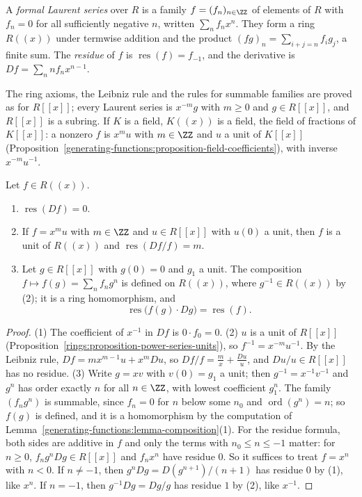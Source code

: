 \begin{definition}\label{generating-functions:definition-laurent}
A \emph{formal Laurent series} over $R$ is a family $f = (f_n)_{n \in \ZZ}$ of elements of $R$ with $f_n = 0$ for all sufficiently negative $n$, written $\sum_nf_nx^n$. They form a ring $R((x))$ under
termwise addition and the product $(fg)_n = \sum_{i+j=n}f_ig_j$, a finite sum. The \emph{residue} of $f$ is $\operatorname{res}(f) = f_{-1}$, and the derivative is $Df = \sum_nnf_nx^{n-1}$.
\end{definition}

The ring axioms, the Leibniz rule and the rules for summable families are proved as for $R[[x]]$; every Laurent series is $x^{-m}g$ with $m \geq 0$ and $g \in R[[x]]$, and $R[[x]]$ is a subring. If
$K$ is a field, $K((x))$ is a field, the field of fractions of $K[[x]]$: a nonzero $f$ is $x^mu$ with $m \in \ZZ$ and $u$ a unit of $K[[x]]$ (Proposition~\ref{generating-functions:proposition-field-coefficients}),
with inverse $x^{-m}u^{-1}$.

\begin{lemma}\label{generating-functions:lemma-residues}
Let $f \in R((x))$.
\begin{enumerate}
\item $\operatorname{res}(Df) = 0$.
\item If $f = x^mu$ with $m \in \ZZ$ and $u \in R[[x]]$ with $u(0)$ a unit, then $f$ is a unit of $R((x))$ and $\operatorname{res}(Df/f) = m$.
\item Let $g \in R[[x]]$ with $g(0) = 0$ and $g_1$ a unit. The composition $f \mapsto f(g) = \sum_nf_ng^n$ is defined on $R((x))$, where $g^{-1} \in R((x))$ by (2); it is a ring homomorphism, and
\[
\operatorname{res}\bigl(f(g) \cdot Dg\bigr) = \operatorname{res}(f).
\]
\end{enumerate}
\end{lemma}

\begin{proof}
(1) The coefficient of $x^{-1}$ in $Df$ is $0 \cdot f_0 = 0$.
(2) $u$ is a unit of $R[[x]]$ (Proposition~\ref{rings:proposition-power-series-units}), so $f^{-1} = x^{-m}u^{-1}$. By the Leibniz rule, $Df = mx^{m-1}u + x^mDu$, so $Df/f = \frac{m}{x} + \frac{Du}{u}$,
and $Du/u \in R[[x]]$ has no residue.
(3) Write $g = xv$ with $v(0) = g_1$ a unit; then $g^{-1} = x^{-1}v^{-1}$ and $g^n$ has order exactly $n$ for all $n \in \ZZ$, with lowest coefficient $g_1^n$. The family $(f_ng^n)$ is summable, since
$f_n = 0$ for $n$ below some $n_0$ and $\operatorname{ord}(g^n) = n$; so $f(g)$ is defined, and it is a homomorphism by the computation of Lemma~\ref{generating-functions:lemma-composition}(1).
For the residue formula, both sides are additive in $f$ and only the terms with $n_0 \leq n \leq -1$ matter: for $n \geq 0$, $f_ng^nDg \in R[[x]]$ and $f_nx^n$ have residue $0$. So it suffices
to treat $f = x^n$ with $n < 0$. If $n \neq -1$, then $g^nDg = D(g^{n+1})/(n + 1)$ has residue $0$ by (1), like $x^n$. If $n = -1$, then $g^{-1}Dg = Dg/g$ has residue $1$ by (2), like $x^{-1}$.
\end{proof}

